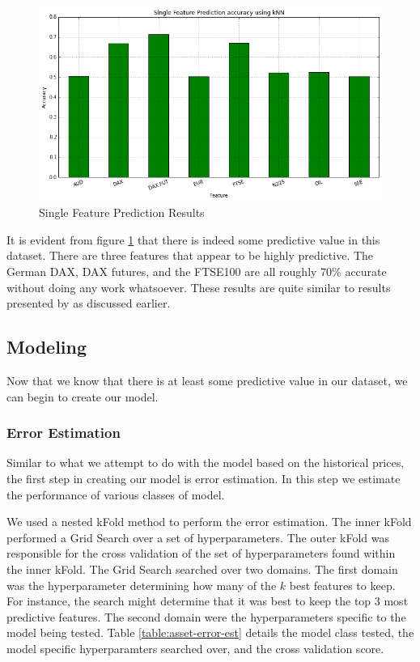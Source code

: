 \documentclass{report}
\begin{document}
\begin{figure}[H]
	\caption{Single Feature Prediction Results}
	\centerline{\includegraphics[scale=0.5]{vis/single_feature_prediction.png}}
	\label{fig:single_feature_prediction}
\end{figure}

It is evident from figure \ref{fig:single_feature_prediction} that there is indeed some predictive value in this dataset. There are three features that appear to be highly predictive. The German DAX, DAX futures, and the FTSE100 are all roughly 70\% accurate without doing any work whatsoever. These results are quite similar to results presented by \citet{shen2012stock} as discussed earlier.

\subsection{Modeling}

Now that we know that there is at least some predictive value in our dataset, we can begin to create our model.

\subsubsection{Error Estimation}

Similar to what we attempt to do with the model based on the historical prices, the first step in creating our model is error estimation. In this step we estimate the performance of various classes of model.

We used a nested kFold method to perform the error estimation. The inner kFold performed a Grid Search over a set of hyperparameters.  The outer kFold was responsible for the cross validation of the set of hyperparameters found within the inner kFold. The Grid Search searched over two domains. The first domain was the hyperparameter determining how many of the $k$ best features to keep. For instance, the search might determine that it was best to keep the top 3 most predictive features. The second domain were the hyperparameters specific to the model being tested. Table \ref{table:asset-error-est} details the model class tested, the model specific hyperparamters searched over, and the cross validation score.
\end{document}
